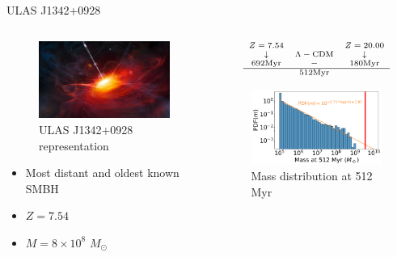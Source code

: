 \documentclass[handout]{beamer}
\begin{document}
\begin{frame}{ULAS J1342+0928}
	\begin{columns}
		\begin{column}{0.4\linewidth}
			\begin{figure}[h]
				\centering
				\includegraphics[width=0.8\linewidth]{"images/ULAS"}
				\caption{ULAS J1342+0928 representation}			
			\end{figure}
			\begin{itemize}
				\item Most distant and oldest known SMBH
				\item $Z = 7.54$
				\item $M = 8\times10^8$ $M_\odot$
			\end{itemize}
		\end{column}
		\begin{column}{0.6\linewidth}
			\begin{equation*}\scriptsize
				\begin{array}{ccc}
					Z = 7.54 & \qquad & Z = 20.00 \\
					\downarrow & \Lambda-\text{CDM} & \downarrow \\
					692 \text{Myr} & - & 180 \text{Myr} \\
					\hline
					& 512 \text{Myr} &
				\end{array}
			\end{equation*}
			\begin{figure}
				\centering
				\includegraphics[width=0.95\linewidth]{"../Files/Week 14/masses_at_slides"}
				\caption{Mass distribution at 512 Myr}
				\label{fig: massDistAt}
			\end{figure}
		\end{column}
	\end{columns}
	
\end{frame}
\end{document}
